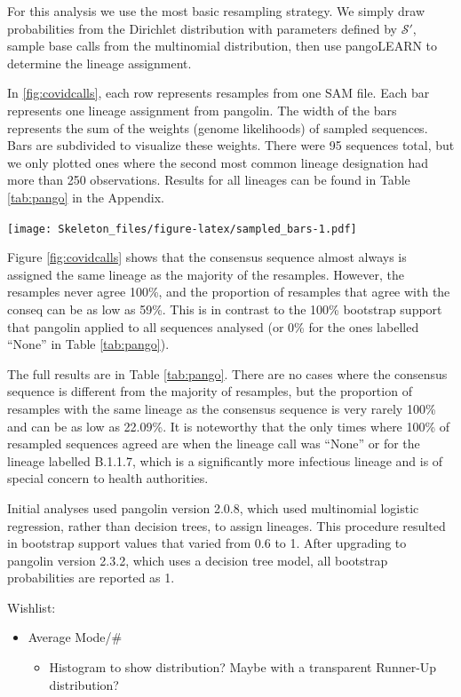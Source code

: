 \documentclass[
]{article}
\providecommand{\tightlist}{%
  \setlength{\itemsep}{0pt}\setlength{\parskip}{0pt}}
\newcommand{\nps}{\mathcal{S}} %
\begin{document}
For this analysis we use the most basic resampling strategy. We simply
draw probabilities from the Dirichlet distribution with parameters
defined by \(\nps'\), sample base calls from the multinomial
distribution, then use pangoLEARN to determine the lineage assignment.

In \ref{fig:covidcalls}, each row represents resamples from one SAM
file. Each bar represents one lineage assignment from pangolin. The
width of the bars represents the sum of the weights (genome likelihoods)
of sampled sequences. Bars are subdivided to visualize these weights.
There were 95 sequences total, but we only plotted ones where the second
most common lineage designation had more than 250 observations. Results
for all lineages can be found in Table \ref{tab:pango} in the Appendix.

\texttt{[image: Skeleton\_files/figure-latex/sampled\_bars-1.pdf]}

Figure \ref{fig:covidcalls} shows that the consensus sequence almost
always is assigned the same lineage as the majority of the resamples.
However, the resamples never agree 100\%, and the proportion of
resamples that agree with the conseq can be as low as 59\%. This is in
contrast to the 100\% bootstrap support that pangolin applied to all
sequences analysed (or 0\% for the ones labelled ``None'' in Table
\ref{tab:pango}).

The full results are in Table \ref{tab:pango}. There are no cases where
the consensus sequence is different from the majority of resamples, but
the proportion of resamples with the same lineage as the consensus
sequence is very rarely 100\% and can be as low as 22.09\%. It is
noteworthy that the only times where 100\% of resampled sequences agreed
are when the lineage call was ``None'' or for the lineage labelled
B.1.1.7, which is a significantly more infectious lineage and is of
special concern to health authorities.

Initial analyses used pangolin version 2.0.8, which used multinomial
logistic regression, rather than decision trees, to assign lineages.
This procedure resulted in bootstrap support values that varied from 0.6
to 1. After upgrading to pangolin version 2.3.2, which uses a decision
tree model, all bootstrap probabilities are reported as 1.

Wishlist:

\begin{itemize}
\tightlist
\item
  Average Mode/\#

  \begin{itemize}
  \tightlist
  \item
    Histogram to show distribution? Maybe with a transparent Runner-Up
    distribution?
  \end{itemize}
\end{itemize}
\end{document}
